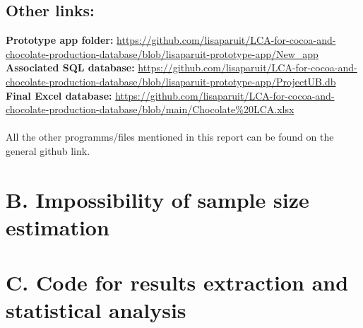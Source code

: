 \documentclass{article}
\begin{document}
\subsection{Other links:}
\textbf{Prototype app folder:}
\url{https://github.com/lisaparuit/LCA-for-cocoa-and-chocolate-production-database/blob/lisaparuit-prototype-app/New_app}\\
\textbf{Associated SQL database:}
\url{https://github.com/lisaparuit/LCA-for-cocoa-and-chocolate-production-database/blob/lisaparuit-prototype-app/ProjectUB.db}\\
\textbf{Final Excel database:}
\url{https://github.com/lisaparuit/LCA-for-cocoa-and-chocolate-production-database/blob/main/Chocolate%20LCA.xlsx}
\\\\All the other programms/files mentioned in this report can be found on the
general github link.

\section{B. Impossibility of sample size estimation}\label{sec:sample_sizing}


\section{C. Code for results extraction and statistical
  analysis}\label{sec:stat_ana_code}


\printbibliography
\end{document}
